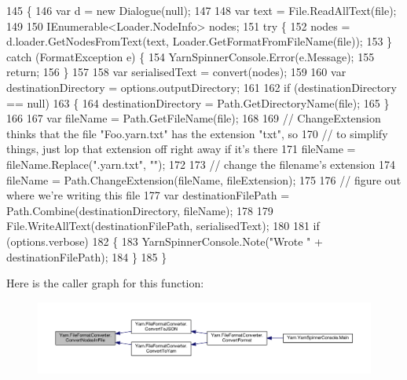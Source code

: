 \begin{DoxyCode}
145         \{
146             var d = \textcolor{keyword}{new} Dialogue(null);
147 
148             var text = File.ReadAllText(file);
149 
150             IEnumerable<Loader.NodeInfo> nodes;
151             \textcolor{keywordflow}{try} \{
152                 nodes = d.loader.GetNodesFromText(text, Loader.GetFormatFromFileName(file));
153             \} \textcolor{keywordflow}{catch} (FormatException e) \{
154                 YarnSpinnerConsole.Error(e.Message);
155                 \textcolor{keywordflow}{return};
156             \}
157 
158             var serialisedText = convert(nodes);
159 
160             var destinationDirectory = options.outputDirectory;
161 
162             \textcolor{keywordflow}{if} (destinationDirectory == null)
163             \{
164                 destinationDirectory = Path.GetDirectoryName(file);
165             \}
166 
167             var fileName = Path.GetFileName(file);
168 
169             \textcolor{comment}{// ChangeExtension thinks that the file "Foo.yarn.txt" has the extension "txt", so}
170             \textcolor{comment}{// to simplify things, just lop that extension off right away if it's there}
171             fileName = fileName.Replace(\textcolor{stringliteral}{".yarn.txt"}, \textcolor{stringliteral}{""});
172 
173             \textcolor{comment}{// change the filename's extension}
174             fileName = Path.ChangeExtension(fileName, fileExtension);
175 
176             \textcolor{comment}{// figure out where we're writing this file}
177             var destinationFilePath = Path.Combine(destinationDirectory, fileName);
178 
179             File.WriteAllText(destinationFilePath, serialisedText);
180 
181             \textcolor{keywordflow}{if} (options.verbose)
182             \{
183                 YarnSpinnerConsole.Note(\textcolor{stringliteral}{"Wrote "} + destinationFilePath);
184             \}
185         \}
\end{DoxyCode}


Here is the caller graph for this function\-:
\nopagebreak
\begin{figure}[H]
\begin{center}
\leavevmode
\includegraphics[width=350pt]{a00107_aa72838be584177b5592c31d73c0febdb_icgraph}
\end{center}
\end{figure}


